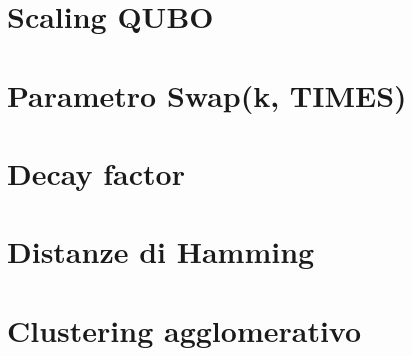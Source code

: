 \section{Scaling QUBO}
 
\section{Parametro Swap(k, TIMES)}

\section{Decay factor}

\section{Distanze di Hamming}
 
\section{Clustering agglomerativo}
